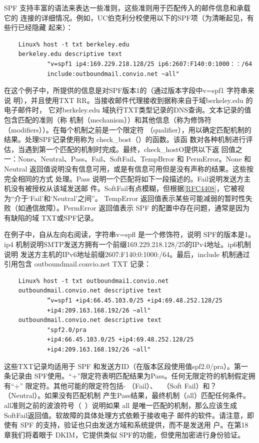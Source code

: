 SPF 支持丰富的语法来表达一些准则，这些准则用于匹配传入的邮件信息和承载它的
连接的详细情况。例如，UC伯克利分校使用以下的SPF项（为清晰起见，有些行已经隐藏
起来）：

\begin{verbatim}
    Linux% host -t txt berkeley.edu
    berkeley.edu descriptive text
            "v=spf1 ip4:169.229.218.128/25 ip6:2607:F140:0:1000：：/64
            include:outboundmail.convio.net ~all"
\end{verbatim}

在这个例子中，所提供的信息是对SPF版本1的（通过版本字段中v=spf1 字符串来说
明），并且使用TXT RR。当接收邮件代理接收到据称来自于域berkeley.edu 的电子邮件时，
它对berkeley.edu 域执行TXT类型记录的DNS查询。文本记录的值包含匹配的准则（称
机制（mechanism））和其他信息（称为修饰符（modifiers））。在每个机制之前是一个限定符
（qualifier），用以确定匹配机制的结果。处理SPF记录使用称为 check\_bost（）的函数。该函
数对各种机制进行评估，当遇到第一个匹配的机制时完成。最终，check\_hostO提供以下返
回值之一：None、Neutral、Pass、Fail、SoftFail、TempBrror 和 PermError。None 和 Neutral
返回值说明没有信息可用，或是有信息可用但是没有声称的结果。这些按完全相同的方式
处理。Pass 说明一个匹配将如下一段描述的。Fail说明发送方主机没有被授权从该域发送邮
件。SoftFail有点模糊，但根据\href{https://www.rfc-editor.org/rfc/rfc4408}{[RFC4408]}，它被视为“介于‘Fail’和‘Neutral’之间”。
TempError 返回值表示某些可能减弱的暂时性失败（如通信故障）。PermError 返回值表示
SPF 的配置中存在问题，通常是因为有缺陷的域 TXT或SPF记录。

在例子中，自从左向右阅读，字符串v=spfl 是一个修饰符，说明 SPF的版本是1。ip4
机制说明SMTP发送方拥有一个前缀169.229.218.128/25的IPv4地址。ip6机制说明
发送方主机的IPv6地址前缀2607:F140:0:1000:/64。最后，include 机制通过引用包含
outboundmail.convio.net TXT 记录：

\begin{verbatim}
    Linux% host -t txt outboundmai1.convio.net
    outboundmail.convio.net descriptive text
            “v=spf1 +ip4:66.45.103.0/25 +ip4:69.48.252.128/25
            +ip4:209.163.168.192/26 ~all"
    outboundmail.convio.net descriptive text
            "spf2.0/pra
            +ip4:66.45.103.0/25 +ip4:69.48.252.128/25
            +ip4:209.163.168.192/26 ~all"
\end{verbatim}

\begin{tcolorbox}
  这些TXT记录均适用于 SPF 和发送方ID（在版本区段使用值spf2.0/pra）。第一
  条记录由 SPF使用。“+”限定符表明匹配结果为Pass。任何无限定符的机制假定拥有“+”
  限定符。其他可能的限定符包括- （Fail）、~ （Soft Fail）和？（Neutral）。如果没有匹配机制
  产生Pass结果，最终机制（all）匹配任何条件。all准则之前的波浪符号（~）说明如果 all
  是唯一匹配的机制，那么应该生成SoftFail返回值。软故障的具体处理方式依赖于接收电子
  邮件的软件。请注意，即使有 SPF 的支持，验证也只由发送方域和系统提供，而不是发送用
  户。在第18 章我们将着眼于 DKIM，它提供类似 SPF的功能，但使用加密进行身份验证。
\end{tcolorbox}

